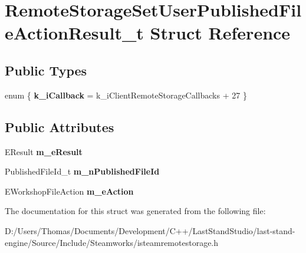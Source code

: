 \hypertarget{structRemoteStorageSetUserPublishedFileActionResult__t}{}\section{Remote\+Storage\+Set\+User\+Published\+File\+Action\+Result\+\_\+t Struct Reference}
\label{structRemoteStorageSetUserPublishedFileActionResult__t}
\subsection*{Public Types}
\begin{DoxyCompactItemize}
\item 
\hypertarget{structRemoteStorageSetUserPublishedFileActionResult__t_a21e01231a63aa0a5ad9083050b5a5f60}{}enum \{ {\bfseries k\+\_\+i\+Callback} = k\+\_\+i\+Client\+Remote\+Storage\+Callbacks + 27
 \}\label{structRemoteStorageSetUserPublishedFileActionResult__t_a21e01231a63aa0a5ad9083050b5a5f60}

\end{DoxyCompactItemize}
\subsection*{Public Attributes}
\begin{DoxyCompactItemize}
\item 
\hypertarget{structRemoteStorageSetUserPublishedFileActionResult__t_a49e125e3cd057e320313fd3856e2bd50}{}E\+Result {\bfseries m\+\_\+e\+Result}\label{structRemoteStorageSetUserPublishedFileActionResult__t_a49e125e3cd057e320313fd3856e2bd50}

\item 
\hypertarget{structRemoteStorageSetUserPublishedFileActionResult__t_ace8d1bdbdd47e5fd15933018b6726756}{}Published\+File\+Id\+\_\+t {\bfseries m\+\_\+n\+Published\+File\+Id}\label{structRemoteStorageSetUserPublishedFileActionResult__t_ace8d1bdbdd47e5fd15933018b6726756}

\item 
\hypertarget{structRemoteStorageSetUserPublishedFileActionResult__t_af971177a8c3d6c0fc35e833c628588ee}{}E\+Workshop\+File\+Action {\bfseries m\+\_\+e\+Action}\label{structRemoteStorageSetUserPublishedFileActionResult__t_af971177a8c3d6c0fc35e833c628588ee}

\end{DoxyCompactItemize}


The documentation for this struct was generated from the following file\+:\begin{DoxyCompactItemize}
\item 
D\+:/\+Users/\+Thomas/\+Documents/\+Development/\+C++/\+Last\+Stand\+Studio/last-\/stand-\/engine/\+Source/\+Include/\+Steamworks/isteamremotestorage.\+h\end{DoxyCompactItemize}
